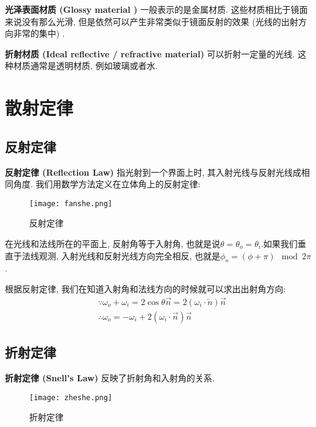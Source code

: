 \textbf{光泽表面材质 (Glossy material ) }一般表示的是金属材质. 这些材质相比于镜面来说没有那么光滑, 但是依然可以产生非常类似于镜面反射的效果 (光线的出射方向非常的集中) . 

\textbf{折射材质 (Ideal reflective / refractive material) } 可以折射一定量的光线. 这种材质通常是透明材质, 例如玻璃或者水. 

\section{散射定律}

\subsection{反射定律}

\textbf{反射定律 (Reflection Law) }指光射到一个界面上时, 其入射光线与反射光线成相同角度. 我们用数学方法定义在立体角上的反射定律: 

\begin{figure}[H]
	\centering
	\texttt{[image: fanshe.png]}
	\caption{反射定律}
	\label{fig:fanshed}
\end{figure}

在光线和法线所在的平面上, 反射角等于入射角, 也就是说$\theta=\theta_o=\theta_i$.如果我们垂直于法线观测, 入射光线和反射光线方向完全相反, 也就是$\phi_o=(\phi+\pi)\mod 2\pi$.

根据反射定律, 我们在知道入射角和法线方向的时候就可以求出出射角方向: 
\begin{equation}
	\begin{split}
		&\because \omega_o + \omega_i = 2\cos\theta \overrightarrow{n} = 2(\omega_i\cdot \overleftarrow{n})\overrightarrow{n}\\
		&\therefore \omega_o = -\omega_i + 2(\omega_i\cdot \overrightarrow{n})\overrightarrow{n}
	\end{split}
\end{equation}

\subsection{折射定律}

\textbf{折射定律 (Snell's Law) }反映了折射角和入射角的关系. 

\begin{figure}[H]
	\centering
	\texttt{[image: zheshe.png]}
	\caption{折射定律}
	\label{fig:zheshe}
\end{figure}

